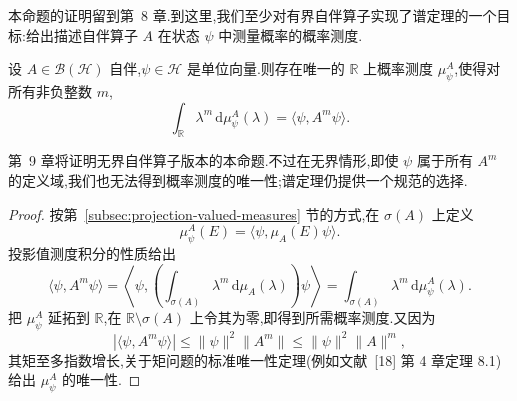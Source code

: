 本命题的证明留到第~8 章.到这里,我们至少对有界自伴算子实现了谱定理的一个目标:给出描述自伴算子 \(A\) 在状态 \(\psi\) 中测量概率的概率测度.

\begin{proposition}[测量概率的谱测度]\label{prop:spectral-measurement-probability}
设 \(A\in\mathcal{B}(\mathcal{H})\) 自伴,\(\psi\in\mathcal{H}\) 是单位向量.则存在唯一的 \(\mathbb{R}\) 上概率测度 \(\mu_{\psi}^{A}\),使得对所有非负整数 \(m\),
\[
\int_{\mathbb{R}}\lambda^{m}\,\mathrm{d}\mu_{\psi}^{A}(\lambda)
=\langle\psi,A^{m}\psi\rangle.
\label{eq:moment-spectral-measure}
\]
\end{proposition}

第~9 章将证明无界自伴算子版本的本命题.不过在无界情形,即使 \(\psi\) 属于所有 \(A^{m}\) 的定义域,我们也无法得到概率测度的唯一性;谱定理仍提供一个规范的选择.

\begin{proof}
按第~\ref{subsec:projection-valued-measures} 节的方式,在 \(\sigma(A)\) 上定义
\[
\mu_{\psi}^{A}(E)=\langle\psi,\mu_{A}(E)\psi\rangle.
\]
投影值测度积分的性质给出
\[
\langle\psi,A^{m}\psi\rangle
=\left\langle\psi,\left(\int_{\sigma(A)}\lambda^{m}\,\mathrm{d}\mu_{A}(\lambda)\right)\psi\right\rangle
=\int_{\sigma(A)}\lambda^{m}\,\mathrm{d}\mu_{\psi}^{A}(\lambda).
\]
把 \(\mu_{\psi}^{A}\) 延拓到 \(\mathbb{R}\),在 \(\mathbb{R}\setminus\sigma(A)\) 上令其为零,即得到所需概率测度.又因为
\[
|\langle\psi,A^{m}\psi\rangle|\leq\|\psi\|^{2}\|A^{m}\|\leq\|\psi\|^{2}\|A\|^{m},
\]
其矩至多指数增长,关于矩问题的标准唯一性定理(例如文献~[18] 第 4 章定理 8.1)给出 \(\mu_{\psi}^{A}\) 的唯一性.
\end{proof}

\ChapterSevenLater
